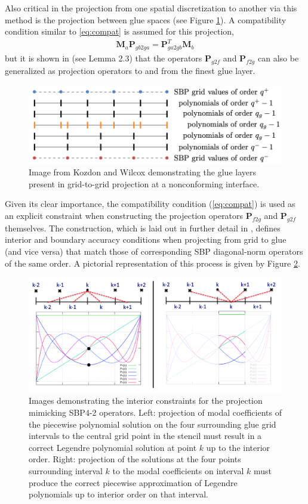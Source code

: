 Also critical in the projection from one spatial discretization to another via this
method is the projection between glue spaces (see Figure \ref{fig:glue_layers}). A
compatibility condition similar to \ref{eq:compat} is assumed for this projection,
\begin{align}
	\pmb{M}_{a}\pmb{P}_{gb2ga} = \pmb{P}_{ga2gb}^{T}\pmb{M}_{b} \label{eq:compat_glues}
\end{align}
but it is shown in \cite{kozdon2016stable} (see Lemma 2.3) that the operators $\pmb{P}_{g2f}$ and
$\pmb{P}_{f2g}$ can also be generalized as projection operators to and from the finest
glue layer.
\begin{figure}
\centering
\includegraphics[width=0.7\linewidth,trim=4 4 4 4,clip]{figures/glue_layers.png}
\caption{Image from Kozdon and Wilcox \cite{kozdon2016stable} demonstrating the glue
         layers present in grid-to-grid projection at a nonconforming interface.}
\label{fig:glue_layers}
\end{figure}
Given its clear importance, the compatibility condition (\ref{eq:compat}) is used as an explicit
constraint when constructing the projection operators $\pmb{P}_{f2g}$ and $\pmb{P}_{g2f}$
themselves. The construction, which is laid out in further detail in \cite{kozdon2016stable},
defines interior and boundary accuracy conditions when projecting from grid to glue
(and vice versa) that match those of corresponding SBP diagonal-norm operators of the
same order. A pictorial representation of this process is given by Figure \ref{fig:projection_layout}.
\begin{figure}
\centering
\includegraphics[width=0.8\linewidth,trim=4 4 4 4,clip]{figures/projection_layout.png}
\caption{Images demonstrating the interior constraints for the projection mimicking SBP4-2
	 operators. Left: projection of modal coefficients of the piecewise polynomial solution
	 on the four surrounding glue grid intervals to the central grid point in the stencil must
	 result in a correct Legendre polynomial solution at point $k$ up to the interior order.
	 Right: projection of the solutions at the four points surrounding interval $k$ to the
	 modal coefficients on interval $k$ must produce the correct piecewise approximation of
	 Legendre polynomials up to interior order on that interval.}
\label{fig:projection_layout}
\end{figure}
